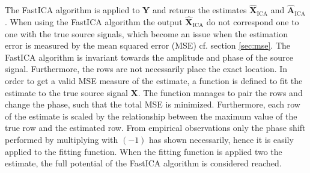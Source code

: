 The FastICA algorithm is applied to $\mathbf{Y}$ and returns the estimates $\hat{\mathbf{X}}_{\text{ICA}}$ and $\hat{\mathbf{A}}_{\text{ICA}}$. 
When using the FastICA algorithm the output $\hat{\mathbf{X}}_{\text{ICA}}$ do not correspond one to one with the true source signals, which become an issue when the estimation error is measured by the mean squared error (MSE) cf. section \ref{sec:mse}.  The FastICA algorithm is invariant towards the amplitude and phase of the source signal.
Furthermore, the rows are not necessarily place the exact location. 
In order to get a valid MSE measure of the estimate, a function is defined to fit the estimate to the true source signal $\mathbf{X}$. 
The function manages to pair the rows and change the phase, such that the total MSE is minimized. 
Furthermore, each row of the estimate is scaled by the relationship between the maximum value of the true row and the estimated row.
From empirical observations only the phase shift performed by multiplying with $(-1)$ has shown necessarily, hence it is easily applied to the fitting function.
When the fitting function is applied two the estimate, the full potential of the FastICA algorithm is considered reached.       

